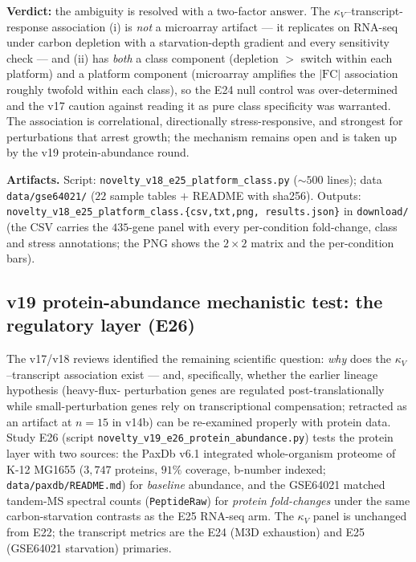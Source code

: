 \documentclass[11pt,a4paper]{article}
\theoremstyle{plain}
\theoremstyle{definition}
\theoremstyle{remark}
\begin{document}
\textbf{Verdict:} the ambiguity is resolved with a two-factor
answer. The $\kappa_V$--transcript-response association (i) is
\emph{not} a microarray artifact --- it replicates on RNA-seq under
carbon depletion with a starvation-depth gradient and every
sensitivity check --- and (ii) has \emph{both} a class component
(depletion $>$ switch within each platform) and a platform
component (microarray amplifies the $|\mathrm{FC}|$ association
roughly twofold within each class), so the E24 null control was
over-determined and the v17 caution against reading it as pure
class specificity was warranted. The association is correlational,
directionally stress-responsive, and strongest for perturbations
that arrest growth; the mechanism remains open and is taken up by
the v19 protein-abundance round.

\textbf{Artifacts.} Script:
\texttt{novelty\_v18\_e25\_platform\_class.py} ($\sim$$500$
lines); data \texttt{data/gse64021/} ($22$ sample tables $+$
README with sha256). Outputs:
\texttt{novelty\_v18\_e25\_platform\_class.\{csv,txt,png,
results.json\}} in \texttt{download/} (the CSV carries the
$435$-gene panel with every per-condition fold-change, class and
stress annotations; the PNG shows the $2\times2$ matrix and the
per-condition bars).

\subsection{v19 protein-abundance mechanistic test: the regulatory
layer (E26)}\label{sec:novelty-v19}

The v17/v18 reviews identified the remaining scientific question:
\emph{why} does the $\kappa_V$--transcript association exist --- and,
specifically, whether the earlier lineage hypothesis (heavy-flux-
perturbation genes are regulated post-translationally while
small-perturbation genes rely on transcriptional compensation;
retracted as an artifact at $n=15$ in v14b) can be re-examined
properly with protein data. Study E26 (script
\texttt{novelty\_v19\_e26\_protein\_abundance.py}) tests the
protein layer with two sources: the PaxDb v6.1 integrated
whole-organism proteome of K-12 MG1655 ($3{,}747$ proteins, $91\%$
coverage, b-number indexed; \texttt{data/paxdb/README.md}) for
\emph{baseline} abundance, and the GSE64021 matched tandem-MS
spectral counts (\texttt{PeptideRaw}) for \emph{protein
fold-changes} under the same carbon-starvation contrasts as the E25
RNA-seq arm. The $\kappa_V$ panel is unchanged from E22; the
transcript metrics are the E24 (M3D exhaustion) and E25 (GSE64021
starvation) primaries.
\end{document}
